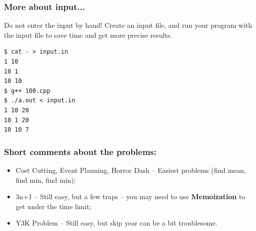 \begin{frame}[fragile]
  \frametitle{More about input...}

  Do not enter the input by hand! Create an input file, and run your
  program with the input file to save time and get more precise
  results.

  \bigskip

  \begin{block}{}
\begin{verbatim}
$ cat - > input.in
1 10
10 1
10 10 
$ g++ 100.cpp
$ ./a.out < input.in
1 10 20
10 1 20
10 10 7
\end{verbatim}
  \end{block}
  
\end{frame}

\begin{frame}
  \frametitle{Short comments about the problems:}
  \begin{itemize}
  \item Cost Cutting, Event Planning, Horror Dash -- Easiest problems (find mean, find min, find min);
    \bigskip

  \item 3n+1 -- Still easy, but a few traps -- you may need to use
    {\bf Memoization} to get under the time limit;
    \bigskip

  \item Y3K Problem -- Still easy, but skip year can be a bit troublesome.
    
  \end{itemize}
\end{frame}

